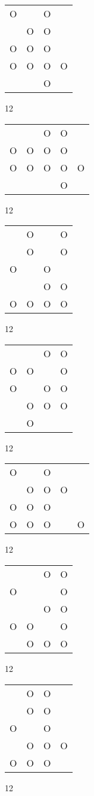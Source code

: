 \begin{tabular}{|m{0.2cm}m{0.2cm}m{0.2cm}m{0.2cm}|}\hline
O& &O& \\
 &O&O& \\
O&O&O& \\
O&O&O&O\\
 & &O& \\
\hline\end{tabular}12
\begin{tabular}{|m{0.2cm}m{0.2cm}m{0.2cm}m{0.2cm}m{0.2cm}|}\hline
 & &O&O& \\
O&O&O&O& \\
O&O&O&O&O\\
 & & &O& \\
\hline\end{tabular}12
\begin{tabular}{|m{0.2cm}m{0.2cm}m{0.2cm}m{0.2cm}|}\hline
 &O& &O\\
 &O& &O\\
O& &O& \\
 & &O&O\\
O&O&O&O\\
\hline\end{tabular}12
\begin{tabular}{|m{0.2cm}m{0.2cm}m{0.2cm}m{0.2cm}|}\hline
 & &O&O\\
O&O& &O\\
O& &O&O\\
 &O&O&O\\
 &O& & \\
\hline\end{tabular}12
\begin{tabular}{|m{0.2cm}m{0.2cm}m{0.2cm}m{0.2cm}m{0.2cm}|}\hline
O& &O& & \\
 &O&O&O& \\
O&O&O& & \\
O&O&O& &O\\
\hline\end{tabular}12
\begin{tabular}{|m{0.2cm}m{0.2cm}m{0.2cm}m{0.2cm}|}\hline
 & &O&O\\
O& & &O\\
 & &O&O\\
O&O& &O\\
 &O&O&O\\
\hline\end{tabular}12
\begin{tabular}{|m{0.2cm}m{0.2cm}m{0.2cm}m{0.2cm}|}\hline
 &O&O& \\
 &O&O& \\
O& &O& \\
 &O&O&O\\
O&O&O& \\
\hline\end{tabular}12
